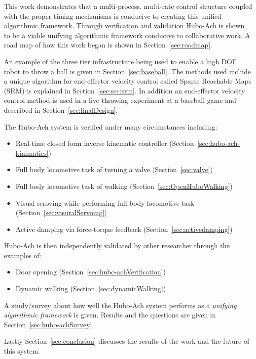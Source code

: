 This work demonstrates that a multi-process, multi-rate control structure coupled with the proper timing mechanisms is conducive to creating this unified algorithmic framework.
Through verification and validation Hubo-Ach is shown to be a viable unifying algorithmic framework conducive to collaborative work.  
A road map of how this work began is shown in Section~\ref{sec:roadmap}.

An example of the three tier infrastructure being used to enable a high DOF robot to throw a ball is given in Section~\ref{sec:baseball}.
The methods used include a unique algorithm for end-effector velocity control called Sparse Reachable Maps (SRM) is explained in Section~\ref{sec:sec:srm}.
In addition an end-effector velocity control method is used in a live throwing experiment at a baseball game and described in Section~\ref{sec:finalDesign}.

The Hubo-Ach system is verified under many circumstances including:
\begin{itemize}
	\item Real-time closed form inverse kinematic controller (Section~\ref{sec:hubo-ach-kinimatics})
	\item Full body locomotive task of turning a valve (Section~\ref{sec:valve})
	\item Full body locomotive task of walking (Section~\ref{sec:OpenHuboWalking})
	\item Visual seroving while performing full body locomotive task (Section~\ref{sec:visuralServoing})
	\item Active damping via force-torque feedback (Section~\ref{sec:activedamping})
\end{itemize}




Hubo-Ach is then independently validated by other researcher through the examples of:
\begin{itemize}
	\item Door opening (Section~\ref{sec:hubo-achVerification})
	\item Dynamic walking (Section~\ref{sec:dynamicWalking})
\end{itemize}


A study/survey about how well the Hubo-Ach system performs as a \textit{unifying algorithmic framework} is given.  
Results and the questions are given in Section~\ref{sec:hubo-achSurvey}.

Lastly Section~\ref{sec:conclusion} discusses the results of the work and the future of this system.

